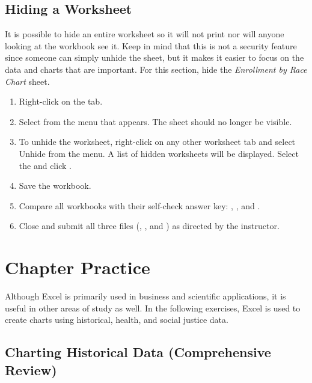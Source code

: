 \subsection{Hiding a Worksheet}

It is possible to hide an entire worksheet so it will not print nor will anyone looking at the workbook see it. Keep in mind that this is not a security feature since someone can simply unhide the sheet, but it makes it easier to focus on the data and charts that are important. For this section, hide the \textit{Enrollment by Race Chart} sheet.

\begin{enumbox}
	\begin{enumerate}
		\item Right-click on the  tab.
		\item Select  from the menu that appears. The  sheet should no longer be visible.
		\item To unhide the worksheet, right-click on any other worksheet tab and select Unhide from the menu. A list of hidden worksheets will be displayed. Select the  and click .
		\item Save the  workbook.
		\item Compare all workbooks with their self-check answer key: , , and .
		\item Close and submit all three files (, , and ) as directed by the instructor.
	\end{enumerate}
\end{enumbox}
	
\section{Chapter Practice}

Although Excel is primarily used in business and scientific applications, it is useful in other areas of study as well. In the following exercises, Excel is used to create charts using historical, health, and social justice data.

\subsection{Charting Historical Data (Comprehensive Review)}

